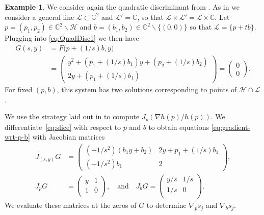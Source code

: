 \documentclass[11pt]{article}
\numberwithin{equation}{section}
\theoremstyle{plain}
\theoremstyle{definition}
\newtheorem{example}[theorem]{Example}
\theoremstyle{remark}
\newcommand{\sH}{{\mathcal H}}
\newcommand\bC{{\mathbb C}}
\begin{document}
\begin{example}
We consider again the quadratic discriminant from . 
As in  we consider a general line $\mathcal L\subset \mathbb C^2$ and $\mathcal L' = \mathbb C$, so that 
$\mathcal{L}\times \mathcal{L}' =  \mathcal{L}\times \bC.$
Let $p = (p_{1},p_{2})\in\bC^2\smallsetminus\sH$ and $b = (b_{1},b_{2}) \in \bC^{2}\smallsetminus \{(0,0)\}$ so that $\mathcal L = \{p+tb\}$. Plugging into \eqref{eq:QuadDisc1} we then have 
    \begin{equation}\label{eq:slice}
    \begin{split}
    G(s,y) & = 
        F\bigl(p + (1/s)b, y\bigr)\\[0.5em] 
        & = 
        \begin{pmatrix}
        y^{2}+(p_{1}+ (1/s) b_{1})y+(p_{2}+(1/s) b_{2})\\
        2y+(p_{1}+(1/s) b_{1})
        \end{pmatrix}
        = \begin{pmatrix}0\\0\end{pmatrix}.
    \end{split}
    \end{equation}
For fixed $(p,b)$, this system has two solutions corresponding to points of $\sH \cap \mathcal{L}$. 

We use the strategy laid out in  to compute $J_{p}(\nabla h(p)/h(p))$. We differentiate~\eqref{eq:slice} with respect to $p$ and  $b$ to obtain equations \eqref{eq:gradient-wrt-p-b} with 
Jacobian matrices
    \begin{equation*}
    \begin{split}
    J_{(s,y)}G & =
    \begin{pmatrix}
    (-1/s^{2})(b_1y+b_2) & 2y+p_1+(1/s) b_1\\
    (-1/s^{2})b_1 & 2
    \end{pmatrix},\\[0.5em]
        J_{p}G & = 
        \begin{pmatrix}
            y & 1\\
            1 & 0\\
        \end{pmatrix},\quad  \text{and}
        \quad
        J_{b}G = 
        \begin{pmatrix}
            y/s & 1/s\\
            1/s & 0\\
        \end{pmatrix}.
    \end{split}
    \end{equation*}
    We evaluate these matrices at the zeros of $G$ to determine $\nabla_{p}s_{j}$ and $\nabla_{b}s_{j}$.
    

\end{example}
\end{document}
